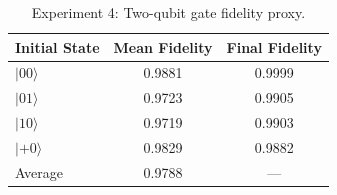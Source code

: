\begin{table}[ht]
\centering
\caption{Experiment 4: Two-qubit gate fidelity proxy.}
\label{tab:exp4}
\begin{tabular}{lcc}
\hline
Initial State & Mean Fidelity & Final Fidelity \\
\hline
$\lvert 00\rangle$ & 0.9881 & 0.9999 \\
$\lvert 01\rangle$ & 0.9723 & 0.9905 \\
$\lvert 10\rangle$ & 0.9719 & 0.9903 \\
$\lvert {+}0\rangle$ & 0.9829 & 0.9882 \\
\hline
Average & 0.9788 & --- \\
\hline
\end{tabular}
\end{table}
